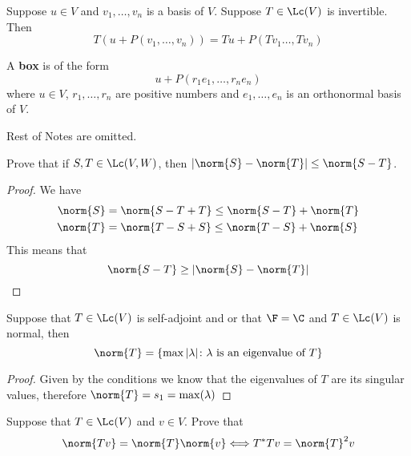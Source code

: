 \documentclass{extarticle}
\begin{document}
\begin{proposition}
    Suppose \(u \in V\) and \(v_1, \ldots, v_n \) is a basis of \(V\). Suppose
    \(T \in \Lc(V)\) is invertible. Then
    \[T(u + P(v_1, \ldots, v_n)) = Tu + P(Tv_1 \ldots, Tv_n)\]
\end{proposition}

\begin{definition}[box]
    A \textbf{box} is of the form
    \[u + P(r_1 e_1, \ldots, r_n e_n)\]
    where \(u \in V\), \(r_1, \ldots, r_n\) are positive numbers and
    \(e_1, \ldots, e_n\) is an orthonormal basis of \(V\).
\end{definition}

Rest of Notes are omitted.


\newpage
{}

\begin{problem}{1}
    Prove that if \(S, T \in \Lc(V, W)\), then
    \(|\norm{S} - \norm{T}| \leq \norm{S - T}\).
\end{problem}

\begin{proof}
We have
\begin{align*}
    \norm{S} &= \norm{S - T + T} \leq \norm{S - T} + \norm{T} \\
    \norm{T} &= \norm{T - S + S} \leq \norm{T - S} + \norm{S}
\end{align*}
This means that
\[\norm{S - T} \geq |\norm{S} - \norm{T}|\]
\end{proof}

\begin{problem}{2}
    Suppose that \(T \in \Lc(V)\) is self-adjoint and
    or that \(\F = \C\) and \(T \in \Lc(V)\) is normal, then
    \[\norm{T} = \{\max |\lambda| \colon \lambda
    \text{ is an eigenvalue of } T\}\]
\end{problem}

\begin{proof}
Given by the conditions we know that the eigenvalues of
\(T\) are its singular values, therefore
\(\norm{T} = s_1 = \max(\lambda)\)
\end{proof}

\begin{problem}{3}
    Suppose that \(T \in \Lc(V)\) and \(v \in V\). Prove that
    \[\norm{Tv} = \norm{T} \norm{v} \Longleftrightarrow
    T^* T v = \norm{T}^2 v\]
\end{problem}
\end{document}
